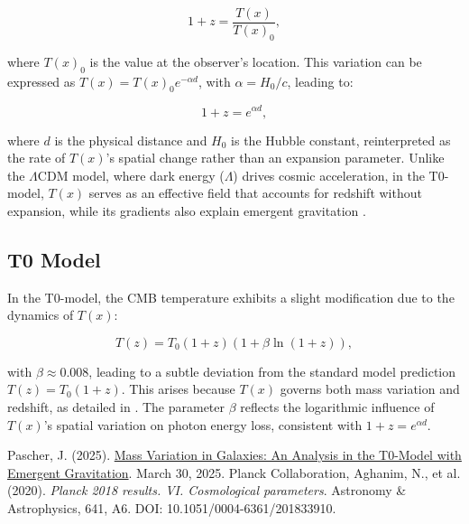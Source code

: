 \documentclass[a4paper,12pt]{article}
\newcommand{\Tfield}{T(x)}
\newcommand{\repobase}{https://github.com/jpascher/T0-Time-Mass-Duality/tree/main/2/}
\begin{document}
	\begin{equation}
		1 + z = \frac{\Tfield}{\Tfield_0},
	\end{equation}
	
	where \( \Tfield_0 \) is the value at the observer's location. This variation can be expressed as \( \Tfield = \Tfield_0 e^{-\alpha d} \), with \( \alpha = H_0/c \), leading to:
	
	\begin{equation}
		1 + z = e^{\alpha d},
	\end{equation}
	
	where \( d \) is the physical distance and \( H_0 \) is the Hubble constant, reinterpreted as the rate of \( \Tfield \)'s spatial change rather than an expansion parameter. Unlike the \(\Lambda\)CDM model, where dark energy (\( \Lambda \)) drives cosmic acceleration, in the T0-model, \( \Tfield \) serves as an effective field that accounts for redshift without expansion, while its gradients also explain emergent gravitation \cite{pascher_galaxies_2025}.
	
	\subsection{T0 Model}
	
	In the T0-model, the CMB temperature exhibits a slight modification due to the dynamics of \( \Tfield \):
	
	\begin{equation}
		T(z) = T_0 (1 + z) (1 + \beta \ln(1 + z)),
	\end{equation}
	
	with \( \beta \approx 0.008 \), leading to a subtle deviation from the standard model prediction \( T(z) = T_0 (1 + z) \). This arises because \( \Tfield \) governs both mass variation and redshift, as detailed in \cite{pascher_galaxies_2025}. The parameter \( \beta \) reflects the logarithmic influence of \( \Tfield \)'s spatial variation on photon energy loss, consistent with \( 1 + z = e^{\alpha d} \).
	
	
	\begin{thebibliography}{9}
		 Pascher, J. (2025). \href{\repobase/pdf/English/Mass Variation in Galaxies - An Analysis in the T0-Model with Emergent Gravitation.pdf}{Mass Variation in Galaxies: An Analysis in the T0-Model with Emergent Gravitation}. March 30, 2025.
		 Planck Collaboration, Aghanim, N., et al. (2020). \textit{Planck 2018 results. VI. Cosmological parameters}. Astronomy \& Astrophysics, 641, A6. DOI: 10.1051/0004-6361/201833910.
	\end{thebibliography}
	
\end{document}
